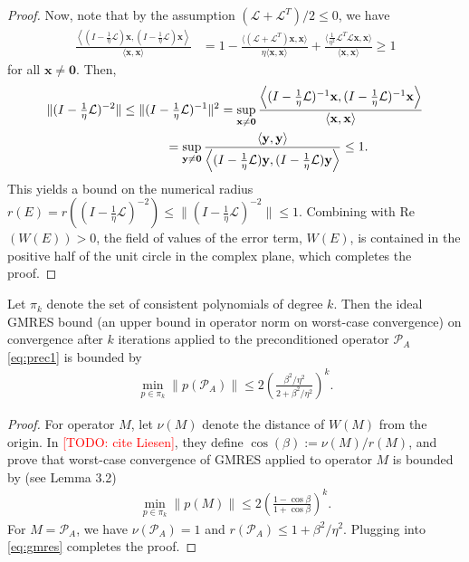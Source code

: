 \documentclass[review]{siamart}
\makeatletter
\newcommand{\todo}[1]{\textcolor{red}{[TODO\@: #1]}}
\makeatother
\begin{document}
\begin{proof}
Now, note that by the assumption $(\mathcal{L}+\mathcal{L}^T)/2 \leq 0$, we have
%
\begin{align}\label{eq:norm1}
\frac{\left\langle (I - \tfrac{1}{\eta}\mathcal{L})\mathbf{x},(I - \tfrac{1}{\eta}\mathcal{L})\mathbf{x}\right\rangle}
	{\langle\mathbf{x},\mathbf{x}\rangle} 
& = 1 - \frac{\langle (\mathcal{L} + \mathcal{L}^T )
	\mathbf{x},\mathbf{x}\rangle}{\eta \langle\mathbf{x},\mathbf{x}\rangle} +
	\frac{\langle \tfrac{1}{\eta^2}\mathcal{L}^T\mathcal{L}\mathbf{x},
	\mathbf{x}\rangle}{\langle\mathbf{x},\mathbf{x}\rangle}
\geq 1
\end{align}
%
for all $\mathbf{x}\neq\mathbf{0}$. Then,
%
\begin{align*}
\|(I - \tfrac{1}{\eta}\mathcal{L})^{-2}\| \leq \|(I - \tfrac{1}{\eta}\mathcal{L})^{-1}\|^2
& = \sup_{\mathbf{x}\neq\mathbf{0}} 
	\frac{\left\langle (I - \tfrac{1}{\eta}\mathcal{L})^{-1}\mathbf{x},
	(I - \tfrac{1}{\eta}\mathcal{L})^{-1}\mathbf{x}\right\rangle}
	{\langle\mathbf{x},\mathbf{x}\rangle} \\
&\hspace{-10ex}= \sup_{\mathbf{y}\neq\mathbf{0}} 
	\frac{\langle\mathbf{y},\mathbf{y}\rangle}{\left\langle (I - \tfrac{1}{\eta}\mathcal{L})\mathbf{y},
	(I - \tfrac{1}{\eta}\mathcal{L})\mathbf{y}\right\rangle}
\leq 1.
\end{align*}
%
This yields a bound on the numerical radius $r(E) = r((I - \tfrac{1}{\eta}\mathcal{L})^{-2})
\leq \|(I - \tfrac{1}{\eta}\mathcal{L})^{-2}\|\leq 1$. Combining with Re$(W(E)) > 0$,
the field of values of the error term, $W(E)$, is contained in the positive half of the
unit circle in the complex plane, which completes the proof.
\end{proof}
%

%
\begin{corollary}\label{cor:gmres}
Let $\pi_k$ denote the set of consistent polynomials of degree $k$. Then the ideal GMRES bound
(an upper bound in operator norm on worst-case convergence) on convergence after $k$ iterations
applied to the preconditioned operator $\mathcal{P}_A$ \eqref{eq:prec1} is bounded by
\begin{align*}
\min_{p\in\pi_k} \|p(\mathcal{P}_A)\| \leq 2\left(\frac{\beta^2/\eta^2}{2 + \beta^2/\eta^2}\right)^k.
\end{align*}
\end{corollary}
\begin{proof}
For operator $M$, let $\nu(M)$ denote the distance of $W(M)$ from the origin. In \todo{cite Liesen},
they define $\cos(\beta) := \nu(M) / r(M)$, and prove that worst-case convergence of GMRES applied
to operator $M$ is bounded by (see Lemma 3.2)
%
\begin{align}\label{eq:gmres}
\min_{p\in\pi_k} \|p(M)\| \leq 2\left(\frac{1-\cos\beta}{1+\cos\beta}\right)^k.
\end{align}
%
For $M = \mathcal{P}_A$, we have $\nu(\mathcal{P}_A)= 1$ and $r(\mathcal{P}_A) \leq 1+\beta^2/\eta^2$.
Plugging into \eqref{eq:gmres} completes the proof. 
\end{proof}
%
\end{document}
